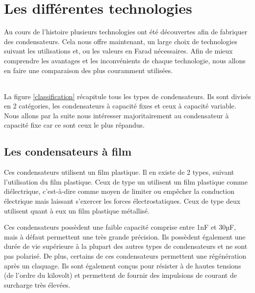 \chapter{Les différentes technologies}

Au cours de l’histoire plusieurs technologies ont été découvertes afin de fabriquer des condensateurs. Cela nous offre maintenant, un large choix de technologies suivant les utilisations et, ou les valeurs en Farad nécessaires. Afin de mieux comprendre les avantages et les inconvénients de chaque technologie, nous allons en faire une comparaison des plus couramment utilisées. \\ \\



La figure \ref{classification} récapitule tous les types de condensateurs. Ils sont divisés en 2 catégories, les condensateurs à capacité fixes et ceux à capacité variable. Nous allons par la suite nous intéresser majoritairement au condensateur à capacité fixe car ce sont ceux le plus répandus.

\section{Les condensateurs à film}


Ces condensateurs utilisent un film plastique. Il en existe de 2 types, suivant l’utilisation du film plastique.  Ceux de type un utilisent un film plastique comme diélectrique, c’est-à-dire comme moyen de limiter ou empêcher la conduction électrique mais laissant s’exercer les forces électrostatiques. Ceux de type deux utilisent quant à eux un film plastique métallisé. \\



Ces condensateurs possèdent une faible capacité comprise entre 1nF et 30µF, mais à défaut permettent une très grande précision. 
Ils possèdent également une durée de vie supérieure à la plupart des autres types de condensateurs et ne sont pas polarisé. 
De plus, certains de ces condensateurs permettent une régénération après un claquage. 
Ils sont également conçus pour résister à de hautes tensions (de l’ordre du kilovolt) et permettent de fournir des impulsions de courant de surcharge très élevées.

\newpage
